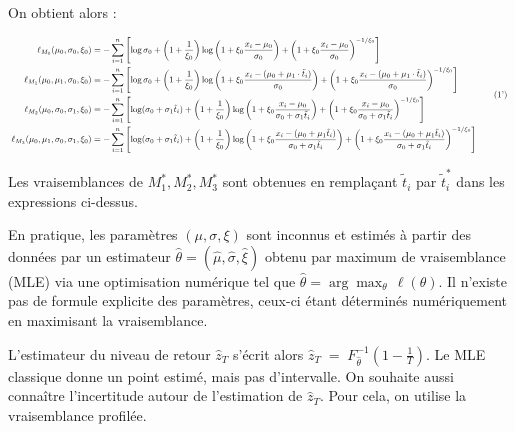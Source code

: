 \documentclass[
  article,
  nofooter,
  noheadings]{jss}
\begin{document}
On obtient alors :

\[
\scalebox{0.7}{
\(
\begin{aligned}
\ell_{M_0}(\mu_0, \sigma_0, \xi_0) &=
-\sum_{i=1}^n \left[
\log \sigma_0 +
\left(1 + \frac{1}{\xi_0} \right) \log \left(1 + \xi_0 \frac{x_i - \mu_0}{\sigma_0} \right) +
\left(1 + \xi_0 \frac{x_i - \mu_0}{\sigma_0} \right)^{-1/\xi_0}
\right]\\ 
\ell_{M_1}(\mu_0, \mu_1, \sigma_0, \xi_0) &=
-\sum_{i=1}^n \left[
\log \sigma_0 +
\left(1 + \frac{1}{\xi_0} \right) \log \left(1 + \xi_0 \frac{x_i - (\mu_0 + \mu_1 \cdot \tilde{t}_i)}{\sigma_0} \right) +
\left(1 + \xi_0 \frac{x_i - (\mu_0 + \mu_1 \cdot \tilde{t}_i)}{\sigma_0} \right)^{-1/\xi_0}
\right]\\ 
\ell_{M_2}(\mu_0, \sigma_0, \sigma_1, \xi_0) &=
-\sum_{i=1}^n \left[
\log (\sigma_0 + \sigma_1 \tilde{t}_i) +
\left(1 + \frac{1}{\xi_0} \right) \log \left(1 + \xi_0 \frac{x_i - \mu_0}{\sigma_0 + \sigma_1 \tilde{t}_i} \right) +
\left(1 + \xi_0 \frac{x_i - \mu_0}{\sigma_0 + \sigma_1 \tilde{t}_i} \right)^{-1/\xi_0}
\right]\\ 
\ell_{M_3}(\mu_0, \mu_1, \sigma_0, \sigma_1, \xi_0) &=
-\sum_{i=1}^n \left[
\log (\sigma_0 + \sigma_1 \tilde{t}_i) +
\left(1 + \frac{1}{\xi_0} \right) \log \left(1 + \xi_0 \frac{x_i - (\mu_0 + \mu_1 \tilde{t}_i)}{\sigma_0 + \sigma_1 \tilde{t}_i} \right) +
\left(1 + \xi_0 \frac{x_i - (\mu_0 + \mu_1 \tilde{t}_i)}{\sigma_0 + \sigma_1 \tilde{t}_i} \right)^{-1/\xi_0}
\right]
\end{aligned}
\tag{1'}
\)
}
\]

Les vraisemblances de \(M_1^*, M_2^*, M_3^*\) sont obtenues en
remplaçant \(\tilde{t}_i\) par \(\tilde{t}_i^\ast\) dans les expressions
ci-dessus.

En pratique, les paramètres \((\mu, \sigma, \xi)\) sont inconnus et
estimés à partir des données par un estimateur
\(\hat{\theta} = (\hat{\mu}, \hat{\sigma}, \hat{\xi})\) obtenu par
maximum de vraisemblance (MLE) via une optimisation numérique tel que
\(\hat{\theta} = \arg\max_{\theta} \, \ell(\theta)\). Il n'existe pas de
formule explicite des paramètres, ceux-ci étant déterminés numériquement
en maximisant la vraisemblance.

L'estimateur du niveau de retour \(\hat{z}_T\) s'écrit alors
\(\hat{z}_{T}\;=\;F^{-1}_{\hat{\theta}}\!\left(1-\frac{1}{T}\right)\).
Le MLE classique donne un point estimé, mais pas d'intervalle. On
souhaite aussi connaître l'incertitude autour de l'estimation de
\(\hat{z}_T\). Pour cela, on utilise la vraisemblance profilée.
\end{document}
